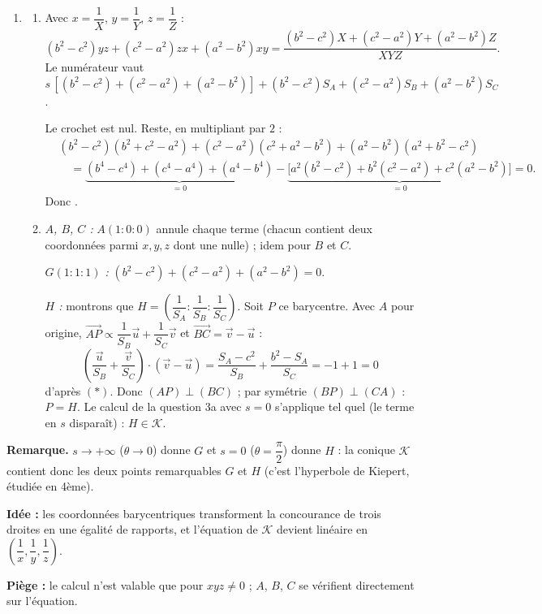 \begin{enumerate}[itemsep=14pt]
  \item\leavevmode
  \begin{enumerate}[itemsep=8pt]
    \item Avec $x=\dfrac1X$, $y=\dfrac1Y$, $z=\dfrac1Z$ :
    \[(b^2-c^2)yz+(c^2-a^2)zx+(a^2-b^2)xy=\dfrac{(b^2-c^2)X+(c^2-a^2)Y+(a^2-b^2)Z}{XYZ}.\]
    Le numérateur vaut $s\,[(b^2-c^2)+(c^2-a^2)+(a^2-b^2)]+(b^2-c^2)S_A+(c^2-a^2)S_B+(a^2-b^2)S_C$.

    Le crochet est nul. Reste, en multipliant par $2$ :
    \[\begin{aligned}&(b^2-c^2)(b^2+c^2-a^2)+(c^2-a^2)(c^2+a^2-b^2)+(a^2-b^2)(a^2+b^2-c^2)\\ &\quad=\underbrace{(b^4-c^4)+(c^4-a^4)+(a^4-b^4)}_{=0}-\underbrace{\big[a^2(b^2-c^2)+b^2(c^2-a^2)+c^2(a^2-b^2)\big]}_{=0}=0.\end{aligned}\]
    Donc .
    \item \emph{$A$, $B$, $C$ :} $A(1:0:0)$ annule chaque terme (chacun contient deux coordonnées parmi $x,y,z$ dont une nulle) ; idem pour $B$ et $C$.

    \emph{$G(1:1:1)$ :} $(b^2-c^2)+(c^2-a^2)+(a^2-b^2)=0$.

    \emph{$H$ :} montrons que $H=\left(\dfrac1{S_A}:\dfrac1{S_B}:\dfrac1{S_C}\right)$. Soit $P$ ce barycentre. Avec $A$ pour origine, $\overrightarrow{AP}\propto\dfrac1{S_B}\overrightarrow{u}+\dfrac1{S_C}\overrightarrow{v}$ et $\overrightarrow{BC}=\overrightarrow{v}-\overrightarrow{u}$ :
    \[\left(\dfrac{\overrightarrow{u}}{S_B}+\dfrac{\overrightarrow{v}}{S_C}\right)\cdot(\overrightarrow{v}-\overrightarrow{u})=\dfrac{S_A-c^2}{S_B}+\dfrac{b^2-S_A}{S_C}=-1+1=0\]
    d'après $(\ast)$. Donc $(AP)\perp(BC)$ ; par symétrie $(BP)\perp(CA)$ : $P=H$. Le calcul de la question 3a avec $s=0$ s'applique tel quel (le terme en $s$ disparaît) : $H\in\mathcal K$.
  \end{enumerate}
\end{enumerate}

\textbf{Remarque.} $s\to+\infty$ ($\theta\to0$) donne $G$ et $s=0$ ($\theta=\dfrac\pi2$) donne $H$ : la conique $\mathcal K$ contient donc les deux points remarquables $G$ et $H$ (c'est l'hyperbole de Kiepert, étudiée en 4ème).

\textbf{Idée :} les coordonnées barycentriques transforment la concourance de trois droites en une égalité de rapports, et l'équation de $\mathcal K$ devient linéaire en $\left(\dfrac1x,\dfrac1y,\dfrac1z\right)$.

\textbf{Piège :} le calcul n'est valable que pour $xyz\neq0$ ; $A$, $B$, $C$ se vérifient directement sur l'équation.
